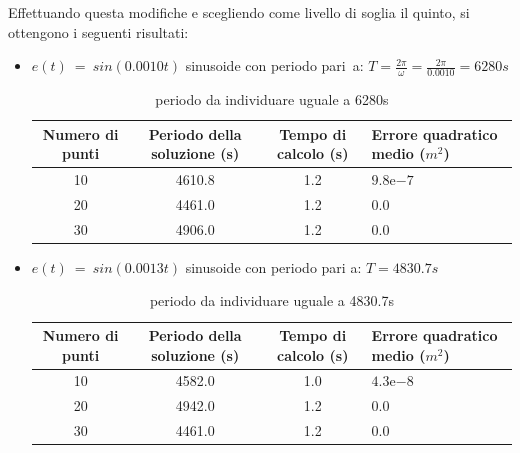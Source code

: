 \documentclass[a4paper,12pt]{report}
\newcommand{\expnumber}[2]{{#1}\mathrm{e}{#2}}
\begin{document}
Effettuando questa modifiche e scegliendo come livello di soglia il quinto, si ottengono i seguenti risultati:
\begin{itemize}
  \item $ e(t)~=~sin(0.0010t)$ sinusoide con periodo pari~a: $T = \frac{2\pi}{\omega} = \frac{2\pi}{0.0010} = 6280s$
  \begin{table}[H]
    \caption{periodo da individuare uguale a 6280s}
    \label{tab:fuori_2}
    \begin{center}
      \begin{tabularx}{\textwidth}{SSSp{0.5\textwidth}}
        \toprule
        {Numero di punti} & {Periodo della soluzione (s)} & {Tempo di calcolo (s)} & {Errore quadratico \newline medio ($m^2$)}\\
        \midrule
        10 &  4610.8  & 1.2 & $\expnumber{9.8}{-7}$\\
        20 &  4461.0 & 1.2 & $0.0$\\
        30 &  4906.0 & 1.2 & $0.0$ \\
        \bottomrule
      \end{tabularx}
    \end{center}
  \end{table}


  \item $ e(t)~=~sin(0.0013t)$ sinusoide con periodo pari a:
  $T = 4830.7s$
  \begin{table}[H]
    \caption{periodo da individuare uguale a 4830.7s}
    \label{tab:limiteSup_2}
    \begin{center}
      \begin{tabularx}{\textwidth}{SSSp{0.5\textwidth}}
        \toprule
        {Numero di punti} & {Periodo della soluzione (s)} & {Tempo di calcolo (s)} & {Errore quadratico \newline medio ($m^2$)}\\
        \midrule
        10 &  4582.0  & 1.0 & $\expnumber{4.3}{-8}$\\
        20 &  4942.0 & 1.2 & $0.0$\\
        30 &  4461.0 & 1.2 & $0.0$\\
        \bottomrule
      \end{tabularx}
    \end{center}
  \end{table}



\end{itemize}
\end{document}

